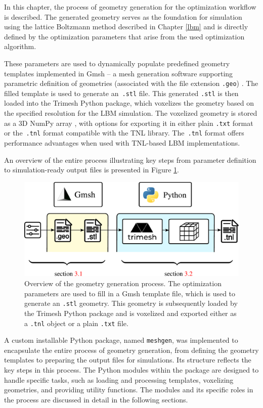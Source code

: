 In this chapter, the process of geometry generation for the optimization workflow is described. The generated geometry serves as the foundation for simulation using the lattice Boltzmann method described in Chapter \ref{lbm} and is directly defined by the optimization parameters that arise from the used optimization algorithm. 

These parameters are used to dynamically populate predefined geometry templates implemented in Gmsh -- a mesh generation software supporting parametric definition of geometries (associated with the file extension \texttt{.geo}) \cite{gmsh}. The filled template is used to generate an~\texttt{.stl} file. This generated \texttt{.stl} is then loaded into the Trimesh \cite{trimesh} Python package, which voxelizes the geometry based on the specified resolution for the LBM simulation. The voxelized geometry is stored as a 3D NumPy array \cite{numpy}, with options for exporting it in either plain \texttt{.txt} format or the~\texttt{.tnl} format compatible with the TNL library. The~\texttt{.tnl} format offers performance advantages when used with TNL-based LBM implementations.

An overview of the entire process illustrating key steps from parameter definition to simulation-ready output files is presented in Figure \ref{fig:meshgen overview}.


\begin{figure}[H]
	\centering
	\includegraphics[width=.92\textwidth]{figures/meshgen.pdf}
	\caption{Overview of the geometry generation process. The optimization parameters are used to fill in a Gmsh  template file, which is used to generate an \texttt{.stl} geometry. This geometry is subsequently loaded by the Trimesh Python package and is voxelized and exported either as a \texttt{.tnl} object or a plain \texttt{.txt} file.}
	\label{fig:meshgen overview}
\end{figure}

A custom installable Python package, named \texttt{meshgen}, was implemented to encapsulate the entire process of geometry generation, from defining the geometry templates to preparing the output files for simulations. Its structure reflects the key steps in this process. The Python modules within the package are designed to handle specific tasks, such as loading and processing templates, voxelizing geometries, and providing utility functions. The modules and its specific roles in the process are discussed in detail in the following sections.

